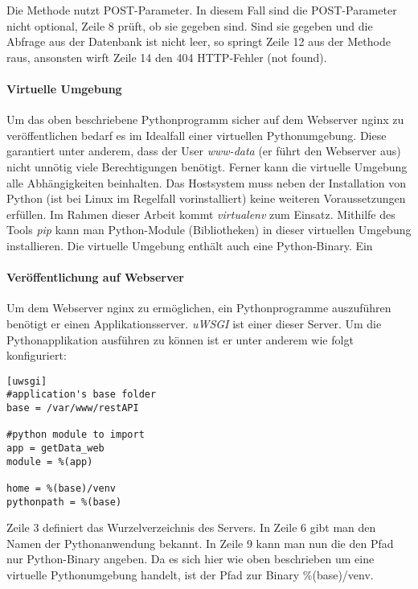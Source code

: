 Die Methode nutzt POST-Parameter. In diesem Fall sind die POST-Parameter nicht optional, Zeile 8 prüft, ob sie gegeben sind. Sind sie gegeben und die Abfrage aus der Datenbank ist nicht leer, so springt Zeile 12 aus der Methode raus, ansonsten wirft Zeile 14 den 404 HTTP-Fehler (not found). 

\paragraph{Virtuelle Umgebung}
Um das oben beschriebene Pythonprogramm sicher auf dem Webserver nginx zu veröffentlichen bedarf es im Idealfall einer virtuellen Pythonumgebung. Diese garantiert unter anderem, dass der User \textit{www-data} (er führt den Webserver aus) nicht unnötig viele Berechtigungen benötigt. Ferner kann die virtuelle Umgebung alle Abhängigkeiten beinhalten. Das Hostsystem muss neben der Installation von Python (ist bei Linux im Regelfall vorinstalliert) keine weiteren Voraussetzungen erfüllen. Im Rahmen dieser Arbeit kommt \textit{virtualenv} zum Einsatz. Mithilfe des Tools \textit{pip} kann man Python-Module (Bibliotheken) in dieser virtuellen Umgebung installieren. Die virtuelle Umgebung enthält auch eine Python-Binary. Ein    

\paragraph{Veröffentlichung auf Webserver}
Um dem Webserver nginx zu ermöglichen, ein Pythonprogramme auszuführen benötigt er einen Applikationsserver. \textit{uWSGI} ist einer dieser Server. Um die Pythonapplikation ausführen zu können ist er unter anderem wie folgt konfiguriert:
\lstset{language=bash, numbers=left, breaklines=true}
\begin{lstlisting}
[uwsgi]
#application's base folder
base = /var/www/restAPI

#python module to import
app = getData_web
module = %(app)

home = %(base)/venv
pythonpath = %(base)
\end{lstlisting}
Zeile 3 definiert das Wurzelverzeichnis des Servers. In Zeile 6 gibt man den Namen der Pythonanwendung bekannt. In Zeile 9 kann man nun die den Pfad nur Python-Binary angeben. Da es sich hier wie oben beschrieben um eine virtuelle Pythonumgebung handelt, ist der Pfad zur Binary \%(base)/venv.